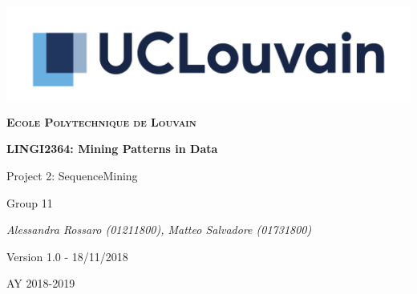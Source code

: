 \documentclass[10pt, a4paper]{article}
\begin{document}
	\begin{titlepage}
		\centering
		\includegraphics[scale =0.8]{logo.jpg}\par\vspace{1cm}
		{\scshape\LARGE\bfseries Ecole Polytechnique de Louvain\par}
		\vspace{1.5cm}
		{\scshape\Large \par}
		\vspace{1.5cm}
		{\huge\bfseries LINGI2364: Mining Patterns in Data \par}
		\vspace{1cm}
		{\Huge Project 2: SequenceMining \par}
		\vspace{2cm}
		{\LARGE Group 11\par}
		\vspace{1cm}
		{\Large\itshape Alessandra Rossaro (01211800), Matteo Salvadore (01731800)\par}
		\vspace{2cm}
		{\small Version 1.0 - 18/11/2018\par}

		\vfill

		{\large AY 2018-2019\par}
	\end{titlepage}
\end{document}
